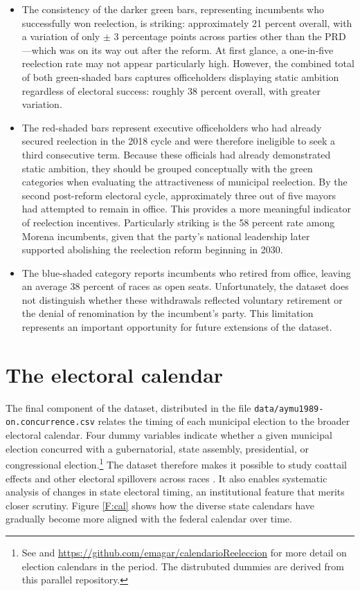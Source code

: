 \documentclass[letter,12pt]{article}
\begin{document}
\begin{itemize}
\item The consistency of the darker green bars, representing incumbents who successfully won reelection, is striking: approximately 21 percent overall, with a variation of only $\pm$ 3 percentage points across parties other than the PRD---which was on its way out after the reform. At first glance, a one-in-five reelection rate may not appear particularly high. However, the combined total of both green-shaded bars captures officeholders displaying static ambition regardless of electoral success: roughly 38 percent overall, with greater variation.
\item The red-shaded bars represent executive officeholders who had already secured reelection in the 2018 cycle and were therefore ineligible to seek a third consecutive term. Because these officials had already demonstrated static ambition, they should be grouped conceptually with the green categories when evaluating the attractiveness of municipal reelection. By the second post-reform electoral cycle, approximately three out of five mayors had attempted to remain in office. This provides a more meaningful indicator of reelection incentives. Particularly striking is the 58 percent rate among Morena incumbents, given that the party's national leadership later supported abolishing the reelection reform beginning in 2030. 
\item The blue-shaded category reports incumbents who retired from office, leaving an average 38 percent of races as open seats. Unfortunately, the dataset does not distinguish whether these withdrawals reflected voluntary retirement or the denial of renomination by the incumbent's party. This limitation represents an important opportunity for future extensions of the dataset.
\end{itemize}
  
\section{The electoral calendar}\label{S:cal}

The final component of the dataset, distributed in the file \verb|data/aymu1989-on.concurrence.csv| relates the timing of each municipal election to the broader electoral calendar. Four dummy variables indicate whether a given municipal election concurred with a gubernatorial, state assembly, presidential, or congressional election.\footnote{See \citet{magarInstReel.2017} and \url{https://github.com/emagar/calendarioReeleccion} for more detail on election calendars in the period. The distrubuted dummies are derived from this parallel repository.} The dataset therefore makes it possible to study coattail effects and other electoral spillovers across races \citep[e.g.,][]{magar.gubCoatMx.2012, ames.1994}. It also enables systematic analysis of changes in state electoral timing, an institutional feature that merits closer scrutiny. Figure \ref{F:cal} shows how the diverse state calendars have gradually become more aligned with the federal calendar over time.
\end{document}
